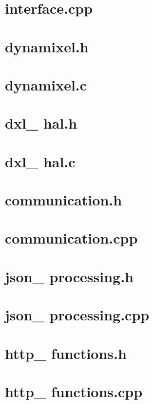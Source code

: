 \documentclass{book}
\begin{document}
\section{interface.cpp}


\section{dynamixel.h}

\section{dynamixel.c}


\section{dxl\_ hal.h}

\section{dxl\_ hal.c}


\section{communication.h}

\section{communication.cpp}


\section{json\_ processing.h}

\section{json\_ processing.cpp}


\section{http\_ functions.h}

\section{http\_ functions.cpp}

\end{document}
